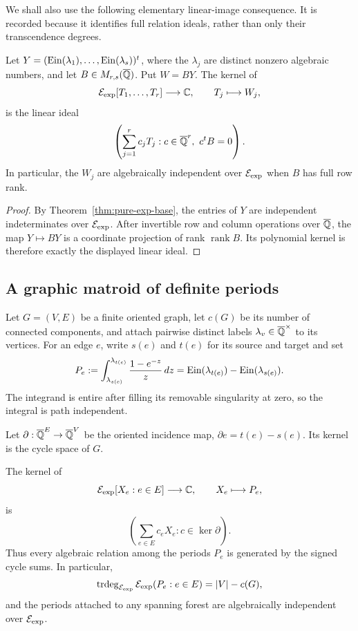 We shall also use the following elementary linear-image consequence.  It is
recorded because it identifies full relation ideals, rather than only their
transcendence degrees.

\begin{lemma}
\label{lem:linear-image-ein}
Let \(Y=(\operatorname{Ein}(\lambda_1),\ldots,\operatorname{Ein}(\lambda_s))^t\), where the
\(\lambda_j\) are distinct nonzero algebraic numbers, and let
\(B\in M_{r,s}(\overline{\mathbb Q})\).  Put \(W=BY\).  The kernel of
\[
 \mathcal E_{\mathrm{exp}}[T_1,\ldots,T_r]\longrightarrow\mathbb C,
 \qquad T_j\longmapsto W_j,
\]
is the linear ideal
\[
 \left(\sum_{j=1}^r c_jT_j:
       c\in\overline{\mathbb Q}^r,\ c^tB=0\right).
\]
In particular, the \(W_j\) are algebraically independent over \(\mathcal E_{\mathrm{exp}}\)
when \(B\) has full row rank.
\end{lemma}

\begin{proof}
By Theorem~\ref{thm:pure-exp-base}, the entries of \(Y\) are independent
indeterminates over \(\mathcal E_{\mathrm{exp}}\).  After invertible row and column operations
over \(\overline{\mathbb Q}\), the map \(Y\mapsto BY\) is a coordinate projection of rank
\(\operatorname{rank}B\).  Its polynomial kernel is therefore exactly the
displayed linear ideal.
\end{proof}

\subsection{A graphic matroid of definite periods}

Let \(G=(V,E)\) be a finite oriented graph, let \(c(G)\) be its number of
connected components, and attach pairwise distinct labels
\(\lambda_v\in\overline{\mathbb Q}^\times\) to its vertices.  For an edge \(e\), write
\(s(e)\) and \(t(e)\) for its source and target and set
\begin{equation}\label{eq:graph-period}
 P_e:=\int_{\lambda_{s(e)}}^{\lambda_{t(e)}}
             \frac{1-e^{-z}}{z}\,dz
     =\operatorname{Ein}(\lambda_{t(e)})-\operatorname{Ein}(\lambda_{s(e)}).
\end{equation}
The integrand is entire after filling its removable singularity at zero, so
the integral is path independent.

Let \(\partial:\overline{\mathbb Q}^E\to\overline{\mathbb Q}^V\) be the oriented incidence map,
\(\partial e=t(e)-s(e)\).  Its kernel is the cycle space of \(G\).

\begin{theorem}\label{thm:graphic-period}
The kernel of
\[
 \mathcal E_{\mathrm{exp}}[X_e:e\in E]\longrightarrow\mathbb C,
 \qquad X_e\longmapsto P_e,
\]
is
\begin{equation}\label{eq:cycle-ideal}
 \left(\sum_{e\in E}c_eX_e:c\in\ker\partial\right).
\end{equation}
Thus every algebraic relation among the periods \(P_e\) is generated by the
signed cycle sums.  In particular,
\[
 \operatorname{trdeg}_{\mathcal E_{\mathrm{exp}}}\mathcal E_{\mathrm{exp}}(P_e:e\in E)
   =|V|-c(G),
\]
and the periods attached to any spanning forest are algebraically
independent over \(\mathcal E_{\mathrm{exp}}\).
\end{theorem}

